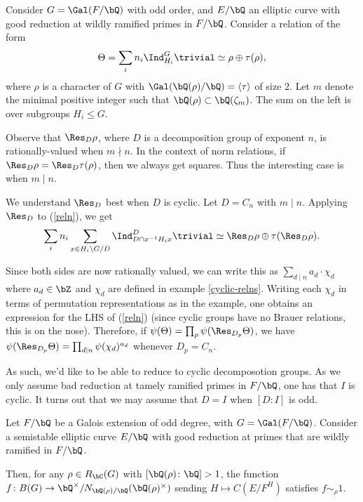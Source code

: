 Consider $G = \Gal(F / \bQ)$ with odd order, and $E / \bQ$ an elliptic curve with good reduction at wildly ramified primes in $F / \bQ$. Consider a relation of the form
\begin{equation}\label{reln} 
    \Theta = \sum_i n_i \Ind_{H_i}^G \trivial \simeq \rho \oplus \tau(\rho),
\end{equation}
where $\rho$ is a character of $G$ with $\Gal(\bQ(\rho) / \bQ) = \langle \tau \rangle $ of size $2$. Let $m$ denote the minimal positive integer such that $\bQ(\rho) \subset \bQ(\zeta_m)$. The sum on the left is over subgroups $H_i \leq G$. 

Observe that $\Res_D\rho$, where $D$ is a decomposition group of exponent $n$, is rationally-valued when $m \nmid n$. In the context of norm relations, if $\Res_D\rho = \Res_D\tau(\rho)$, then we always get squares. Thus the interesting case is when $m \mid n$. 

We understand $\Res_D$ best when $D$ is cyclic. Let $D = C_n$ with $m \mid n$. Applying $\Res_D$ to (\ref{reln}), we get
\begin{equation}\label{reln-resD}
\sum_i n_i \sum_{x \in H_i \backslash G / D} \Ind_{D \cap x^{-1}H_i x}^D \trivial \simeq \Res_D \rho \oplus \tau(\Res_D \rho).
\end{equation}

Since both sides are now rationally valued, we can write this as $\sum_{d \mid n} a_d \cdot \chi_d$ where $a_d \in \bZ$ and $\chi_d$ are defined in example \ref{cyclic-relns}. Writing each $\chi_d$ in terms of permutation representations as in the example, one obtains an expression for the LHS of (\ref{reln}) (since cyclic groups have no Brauer relations, this is on the nose).
Therefore, if $\psi(\Theta) = \prod_p \psi(\Res_{D_p} \Theta)$, we have $\psi(\Res_{D_p} \Theta) = \prod_{d \mid n} \psi(\chi_d)^{a_d}$ whenever $D_p = C_n$.

As such, we'd like to be able to reduce to cyclic decomposotion groups. As we only assume bad reduction at tamely ramified primes in $F / \bQ$, one has that $I$ is cyclic. 
It turns out that we may assume that $D = I$ when $[D \colon I]$ is odd. 

\begin{thm}
    Let $F / \bQ$ be a Galois extension of odd degree, with $G = \Gal(F / \bQ)$. 
    Consider a semistable elliptic curve $E / \bQ$ with good reduction at primes that are wildly ramified in $F / \bQ$.
    
    Then, for any $\rho \in R_{\bC}(G)$ with $[\bQ(\rho)\colon \bQ] > 1$, the function $f \colon B(G) \to
    \bQ^{\times} / N_{\bQ(\rho) / \bQ}(\bQ(\rho)^{\times})$ sending $H \mapsto C(E / F^{H})$ satisfies $f \sim_{\rho} 1$.
\end{thm}
